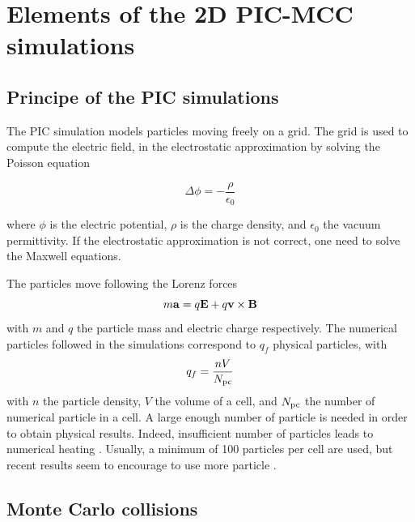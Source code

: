 
\section{Elements of the 2D PIC-MCC simulations}
  \label{sec-elements}
  \subsection{Principe of the PIC simulations}

    The \ac{PIC} simulation models particles moving freely on a grid.
    The grid is used to compute the electric field, in the electrostatic approximation by solving the Poisson equation

    \begin{equation}
      \label{eq-poisson}
      \Delta \phi = - \frac{\rho}{\epsilon_0}
    \end{equation}

    where $\phi$ is the electric potential, $\rho$ is the charge density, and $\epsilon_0$ the vacuum permittivity.
    If the electrostatic approximation is not correct, one need to solve the Maxwell equations.

    The particles move following the Lorenz forces
    \begin{equation}
      \label{eq-Lor}
      m {\bf a} = q {\mathbf E} + q {\bf v} \times {\bf B}
    \end{equation}
    with $m$ and $q$ the particle mass and electric charge respectively.
    The numerical particles followed in the simulations correspond to $q_f$ physical particles, with
    \begin{equation}
      q_f = \frac{n V}{N_{\rm pc}}
    \end{equation}
    with $n$ the particle density, $V$ the volume of a cell, and $N_{\rm pc}$ the number of numerical particle in a cell.
    A large enough number of particle is needed in order to obtain physical results.
    Indeed, insufficient number of particles leads to numerical heating \cite{ueda1994}.
    Usually, a minimum of 100 particles per cell are used, but recent results seem to encourage to use more particle \cite{janhunen2018}.

  \subsection{Monte Carlo collisions}

